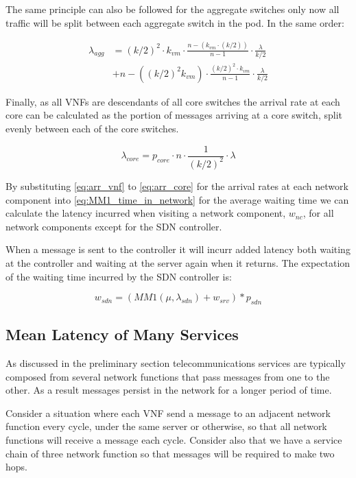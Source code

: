 The same principle can also be followed for the aggregate switches only now all traffic will be split between each aggregate switch in the pod. In the same order:

\begin{equation}
\label{eq:arr_agg}
\begin{split}
\lambda_{agg} &= (k/2)^2 \cdot k_{vm} \cdot \frac{n - (k_{vm} \cdot (k/2))}{n - 1} \cdot \frac{\lambda}{k/2} \\
			  &+ n - ((k/2)^2 k_{vm}) \cdot \frac{(k/2)^2 \cdot k_{vm}}{n - 1} \cdot \frac{\lambda}{k/2}
\end{split}
\end{equation}

Finally, as all VNFs are descendants of all core switches the arrival rate at each core can be calculated as the portion of messages arriving at a core switch, split evenly between each of the core switches.

\begin{equation}
\label{eq:arr_core}
\lambda_{core} = p_{core} \cdot n \cdot  \frac{1}{(k / 2)^2} \cdot  \lambda
\end{equation}

By substituting \ref{eq:arr_vnf} to \ref{eq:arr_core} for the arrival rates at each network component into \ref{eq:MM1_time_in_network} for the average waiting time we can calculate the latency incurred when visiting a network component, $w_{nc}$, for all network components except for the SDN controller.

When a message is sent to the controller it will incurr added latency both waiting at the controller and waiting at the server again when it returns. The expectation of the waiting time incurred by the SDN controller is:

\begin{equation}
w_{sdn} = (MM1(\mu, \lambda_{sdn}) + w_{srv}) * p_{sdn}
\end{equation}

\subsection{Mean Latency of Many Services}
As discussed in the preliminary section telecommunications services are typically composed from several network functions that pass messages from one to the other. As a result messages persist in the network for a longer period of time. 

Consider a situation where each VNF send a message to an adjacent network function every cycle, under the same server or otherwise, so that all network functions will receive a message each cycle. Consider also that we have a service chain of three network function so that messages will be required to make two hops. 

